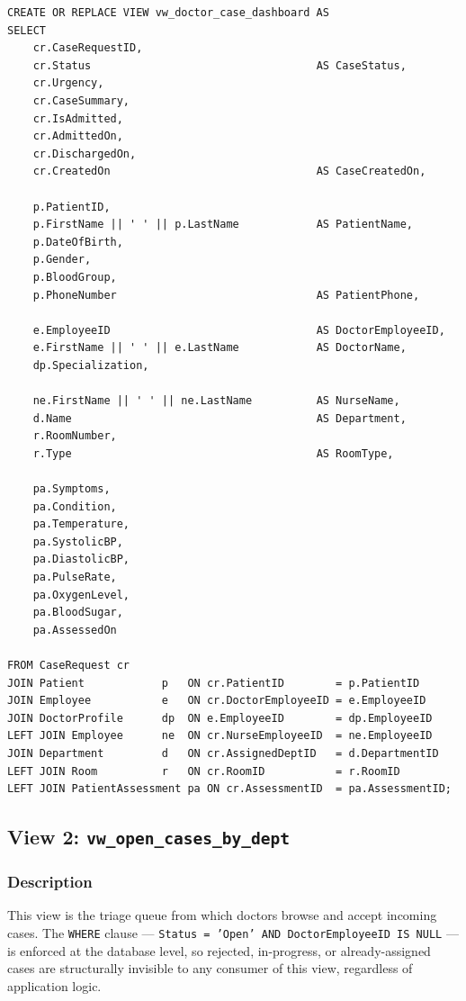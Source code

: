 \documentclass{article}
\begin{document}
\begin{lstlisting}
CREATE OR REPLACE VIEW vw_doctor_case_dashboard AS
SELECT
    cr.CaseRequestID,
    cr.Status                                   AS CaseStatus,
    cr.Urgency,
    cr.CaseSummary,
    cr.IsAdmitted,
    cr.AdmittedOn,
    cr.DischargedOn,
    cr.CreatedOn                                AS CaseCreatedOn,

    p.PatientID,
    p.FirstName || ' ' || p.LastName            AS PatientName,
    p.DateOfBirth,
    p.Gender,
    p.BloodGroup,
    p.PhoneNumber                               AS PatientPhone,

    e.EmployeeID                                AS DoctorEmployeeID,
    e.FirstName || ' ' || e.LastName            AS DoctorName,
    dp.Specialization,

    ne.FirstName || ' ' || ne.LastName          AS NurseName,
    d.Name                                      AS Department,
    r.RoomNumber,
    r.Type                                      AS RoomType,

    pa.Symptoms,
    pa.Condition,
    pa.Temperature,
    pa.SystolicBP,
    pa.DiastolicBP,
    pa.PulseRate,
    pa.OxygenLevel,
    pa.BloodSugar,
    pa.AssessedOn

FROM CaseRequest cr
JOIN Patient            p   ON cr.PatientID        = p.PatientID
JOIN Employee           e   ON cr.DoctorEmployeeID = e.EmployeeID
JOIN DoctorProfile      dp  ON e.EmployeeID        = dp.EmployeeID
LEFT JOIN Employee      ne  ON cr.NurseEmployeeID  = ne.EmployeeID
JOIN Department         d   ON cr.AssignedDeptID   = d.DepartmentID
LEFT JOIN Room          r   ON cr.RoomID           = r.RoomID
LEFT JOIN PatientAssessment pa ON cr.AssessmentID  = pa.AssessmentID;
\end{lstlisting}

\subsection{View 2: \texttt{vw\_open\_cases\_by\_dept}}

\subsubsection{Description}
This view is the triage queue from which doctors browse and accept incoming cases. The \texttt{WHERE} clause --- \texttt{Status = 'Open' AND DoctorEmployeeID IS NULL} --- is enforced at the database level, so rejected, in-progress, or already-assigned cases are structurally invisible to any consumer of this view, regardless of application logic.
\end{document}

